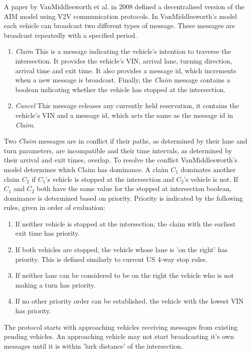 A paper by VanMiddlesworth et al. in 2008 \citep{VanMiddlesworth2008} defined a decentralised version of the AIM model using V2V communication protocols. In VanMiddlesworth's model each vehicle can broadcast two different types of message. These messages are broadcast repeatedly with a specified period.
\begin{enumerate}
\item \emph{Claim}
This is a message indicating the vehicle's intention to traverse the intersection. It provides the vehicle's VIN, arrival lane, turning direction, arrival time and exit time. It also provides a message id, which increments when a new message is broadcast. Finally, the \emph{Claim} message contains a boolean indicating whether the vehicle has stopped at the intersection.
\item \emph{Cancel}
This message releases any currently held reservation, it contains the vehicle's VIN and a message id, which acts the same as the message id in \emph{Claim}.
\end{enumerate}

Two \emph{Claim} messages are in conflict if their paths, as determined by their lane and turn parameters, are incompatible and their time intervals, as determined by their arrival and exit times, overlap. To resolve the conflict VanMiddlesworth's model determines which Claim has dominance. A claim $C_1$ dominates another claim $C_2$ if $C_1$'s vehicle is stopped at the intersection and $C_2$'s vehicle is not. If $C_1$ and $C_2$ both have the same value for the stopped at intersection boolean, dominance is determined based on priority. Priority is indicated by the following rules, given in order of evaluation:
\begin{enumerate}
\item If neither vehicle is stopped at the intersection, the claim with the earliest exit time has priority.
\item If both vehicles are stopped, the vehicle whose lane is 'on the right' has priority. This is defined similarly to current US 4-way stop rules.
\item If neither lane can be considered to be on the right the vehicle who is not making a turn has priority.
\item If no other priority order can be established, the vehicle with the lowest VIN has priority.
\end{enumerate}

The protocol starts with approaching vehicles receiving messages from existing pending vehicles. An approaching vehicle may not start broadcasting it's own messages until it is within 'lurk distance' of the intersection. 


